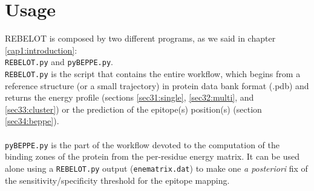 \documentclass[a4paper,12pt]{book}
\begin{document}
\chapter{Usage}
\label{cap3:usage}
REBELOT is composed by two different programs, as we said in chapter \ref{cap1:introduction}: \\\texttt{REBELOT.py} and \texttt{pyBEPPE.py}. \\
\texttt{REBELOT.py} is the script that contains the entire workflow, which begins from a reference structure (or a small trajectory) in protein data bank format (.pdb) and returns the energy profile (sections \ref{sec31:single}, \ref{sec32:multi}, and \ref{sec33:cluster}) or the prediction of the epitope(s) position(s) (section \ref{sec34:beppe}). \\ \\
\texttt{pyBEPPE.py} is the part of the workflow devoted to the computation of the binding zones of the protein from the per-residue energy matrix. It can be used alone using a \texttt{REBELOT.py} output (\texttt{enematrix.dat}) to make one \textit{a posteriori} fix of the sensitivity/specificity threshold for the epitope mapping.
\end{document}
